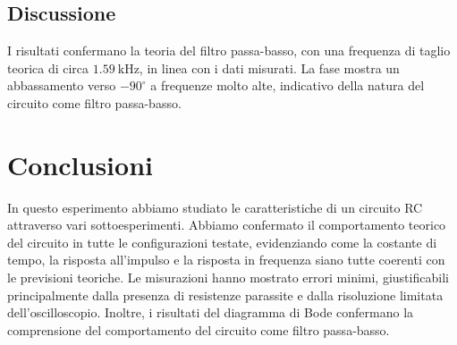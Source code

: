 \documentclass[a4paper,10pt]{article}
\begin{document}
\subsection{Discussione}
I risultati confermano la teoria del filtro passa-basso, con una frequenza di taglio teorica di circa \(\SI{1.59}{\kilo\hertz}\), in linea con i dati misurati. La fase mostra un abbassamento verso \(-90^\circ\) a frequenze molto alte, indicativo della natura del circuito come filtro passa-basso.


\section{Conclusioni}
In questo esperimento abbiamo studiato le caratteristiche di un circuito RC attraverso vari sottoesperimenti. Abbiamo confermato il comportamento teorico del circuito in tutte le configurazioni testate, evidenziando come la costante di tempo, la risposta all'impulso e la risposta in frequenza siano tutte coerenti con le previsioni teoriche. Le misurazioni hanno mostrato errori minimi, giustificabili principalmente dalla presenza di resistenze parassite e dalla risoluzione limitata dell'oscilloscopio. Inoltre, i risultati del diagramma di Bode confermano la comprensione del comportamento del circuito come filtro passa-basso.
\end{document}
